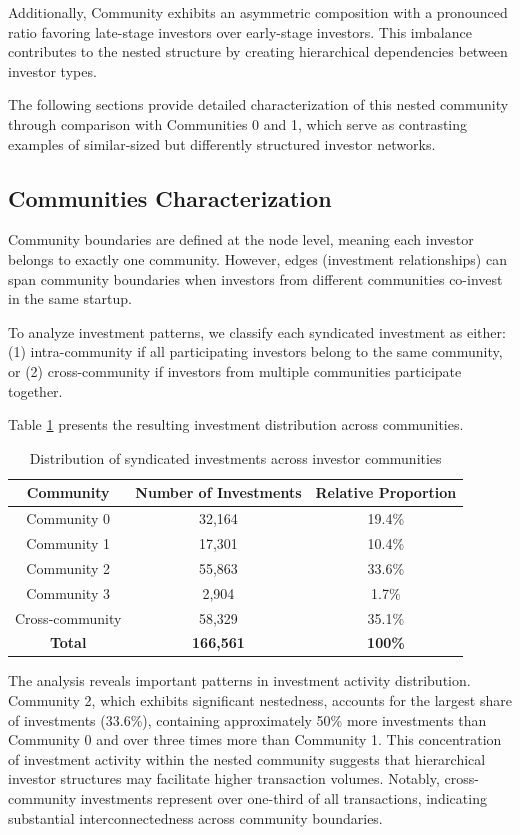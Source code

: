Additionally, Community \interestingCommunity{} exhibits an asymmetric composition with a pronounced ratio favoring late-stage investors over early-stage investors. This imbalance contributes to the nested structure by creating hierarchical dependencies between investor types.

The following sections provide detailed characterization of this nested community through comparison with Communities 0 and 1, which serve as contrasting examples of similar-sized but differently structured investor networks.

\subsection{Communities Characterization}

Community boundaries are defined at the node level, meaning each investor belongs to exactly one community. However, edges (investment relationships) can span community boundaries when investors from different communities co-invest in the same startup.

To analyze investment patterns, we classify each syndicated investment as either: (1) intra-community if all participating investors belong to the same community, or (2) cross-community if investors from multiple communities participate together.

Table \ref{tab:investment_distribution} presents the resulting investment distribution across communities.

\begin{table}[htbp]
\centering
\begin{tabular}{|c|c|c|}
\hline
\textbf{Community} & \textbf{Number of Investments} & \textbf{Relative Proportion} \\
\hline
Community 0 & 32,164 & 19.4\% \\
Community 1 & 17,301 & 10.4\% \\
Community 2 & 55,863 & 33.6\% \\
Community 3 & 2,904 & 1.7\% \\
Cross-community & 58,329 & 35.1\% \\
\hline
\textbf{Total} & \textbf{166,561} & \textbf{100\%} \\
\hline
\end{tabular}
\caption{Distribution of syndicated investments across investor communities}
\label{tab:investment_distribution}
\end{table}

The analysis reveals important patterns in investment activity distribution. Community 2, which exhibits significant nestedness, accounts for the largest share of investments (33.6\%), containing approximately 50\% more investments than Community 0 and over three times more than Community 1. This concentration of investment activity within the nested community suggests that hierarchical investor structures may facilitate higher transaction volumes. Notably, cross-community investments represent over one-third of all transactions, indicating substantial interconnectedness across community boundaries.


